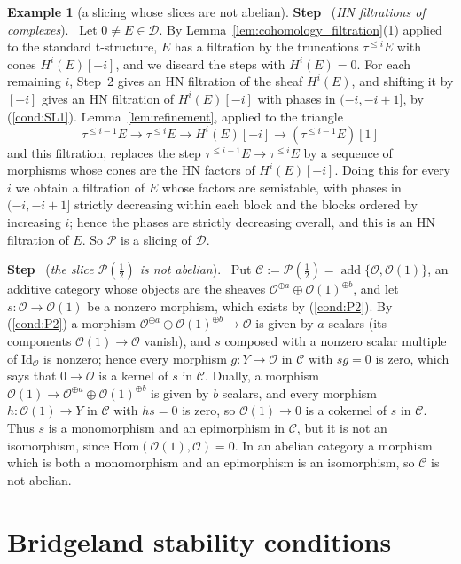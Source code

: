 \documentclass[12pt]{amsart}
\newcommand{\condref}[1]{\textup{(\ref{#1})}}
\numberwithin{theorem}{section}
\theoremstyle{definition}
\newtheorem{example}[theorem]{Example}
\newcounter{pstep}
\newcommand{\step}[1]{\par\medskip\noindent\refstepcounter{pstep}\textbf{Step \thepstep}\ (\textit{#1}).\ \ignorespaces}
\newcommand{\calC}{\mathcal{C}}
\newcommand{\calP}{\mathcal{P}}
\newcommand{\Hom}{\mathrm{Hom}}
\newcommand{\id}{\mathrm{Id}}
\newcommand{\oo}{\mathscr{O}}
\newcommand{\calD}{\mathcal{D}}
\begin{document}
\begin{example}[a slicing whose slices are not abelian]
		\step{HN filtrations of complexes}
		Let $0 \neq E \in \calD$.
		By Lemma~\ref{lem:cohomology_filtration}(1) applied to the standard t-structure, $E$ has a filtration by the truncations $\tau^{\leqslant i} E$ with cones $H^i(E)[-i]$, and we discard the steps with $H^i(E) = 0$.
		For each remaining $i$, Step~2 gives an HN filtration of the sheaf $H^i(E)$, and shifting it by $[-i]$ gives an HN filtration of $H^i(E)[-i]$ with phases in $(-i, -i + 1]$, by \condref{cond:SL1}.
		Lemma~\ref{lem:refinement}, applied to the triangle 
		\[
		\tau^{\leqslant i - 1} E \to \tau^{\leqslant i} E \to H^i(E)[-i] \to (\tau^{\leqslant i - 1} E)[1]
		\] 
		and this filtration, replaces the step $\tau^{\leqslant i - 1} E \to \tau^{\leqslant i} E$ by a sequence of morphisms whose cones are the HN factors of $H^i(E)[-i]$.
		Doing this for every $i$ we obtain a filtration of $E$ whose factors are semistable, with phases in $(-i, -i + 1]$ strictly decreasing within each block and the blocks ordered by increasing $i$;
		hence the phases are strictly decreasing overall, and this is an HN filtration of $E$.
		So $\calP$ is a slicing of $\calD$.

		\step{the slice $\calP(\frac12)$ is not abelian}
		Put $\calC := \calP(\tfrac12) = \operatorname{add} \{ \oo, \oo(1) \}$, an additive category whose objects are the sheaves $\oo^{\oplus a} \oplus \oo(1)^{\oplus b}$, and let $s \colon \oo \to \oo(1)$ be a nonzero morphism, which exists by \condref{cond:P2}.
		By \condref{cond:P2} a morphism $\oo^{\oplus a} \oplus \oo(1)^{\oplus b} \to \oo$ is given by $a$ scalars (its components $\oo(1) \to \oo$ vanish), and $s$ composed with a nonzero scalar multiple of $\id_{\oo}$ is nonzero;
		hence every morphism $g \colon Y \to \oo$ in $\calC$ with $s g = 0$ is zero, which says that $0 \to \oo$ is a kernel of $s$ in $\calC$.
		Dually, a morphism $\oo(1) \to \oo^{\oplus a} \oplus \oo(1)^{\oplus b}$ is given by $b$ scalars, and every morphism $h \colon \oo(1) \to Y$ in $\calC$ with $h s = 0$ is zero, so $\oo(1) \to 0$ is a cokernel of $s$ in $\calC$.
		Thus $s$ is a monomorphism and an epimorphism in $\calC$, but it is not an isomorphism, since $\Hom(\oo(1), \oo) = 0$.
		In an abelian category a morphism which is both a monomorphism and an epimorphism is an isomorphism, so $\calC$ is not abelian.
	\end{example}

	\section{Bridgeland stability conditions}
\end{document}
